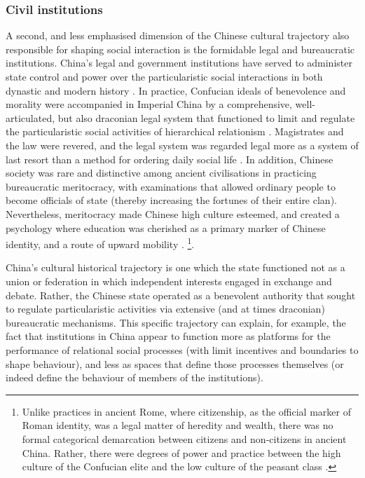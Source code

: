 \begin{CJK}{UTF8}{gbsn}
\subsubsection{Civil institutions}
A second, and less emphasised dimension of the Chinese cultural trajectory also responsible for shaping social interaction is the formidable legal and bureaucratic institutions.  China's legal and government institutions have served to administer state control and power over the particularistic social interactions in both dynastic and modern history \citep[]{Liu2017}.  In practice, Confucian ideals of benevolence and morality were accompanied in Imperial China by a comprehensive, well-articulated, but also draconian legal system that functioned to limit and regulate the particularistic social activities of hierarchical relationism \citep{Fitzgerald1985}.  Magistrates and the law were revered, and the legal system was regarded legal more as a system of last resort than a method for ordering daily social life \citep{Liu2009}.  In addition, Chinese society was rare and distinctive among ancient civilisations in practicing bureaucratic meritocracy, with examinations that allowed ordinary people to become officials of state (thereby increasing the fortunes of their entire clan).  Nevertheless, meritocracy made Chinese high culture esteemed, and created a psychology where education was cherished as a primary marker of Chinese identity, and a route of upward mobility \citep{Spence1990}. \footnote{Unlike practices in ancient Rome, where citizenship, as the official marker of Roman identity, was a legal matter of heredity and wealth, there was no formal categorical demarcation between citizens and non-citizens in ancient China.  Rather, there were degrees of power and practice between the high culture of the Confucian elite and the low culture of the peasant class \citep[see][]{Liu2014}.}.

China's cultural historical trajectory is one which the state functioned not as a union or federation in which independent interests engaged in exchange and debate.  Rather, the Chinese state operated as a benevolent authority that sought to regulate particularistic activities via extensive (and at times draconian) bureaucratic mechanisms.  This specific trajectory can explain, for example, the fact that institutions in China appear to function more as platforms for the performance of relational social processes (with limit incentives and boundaries to shape behaviour), and less as spaces that define those processes themselves (or indeed define the behaviour of members of the institutions).


\end{CJK}
